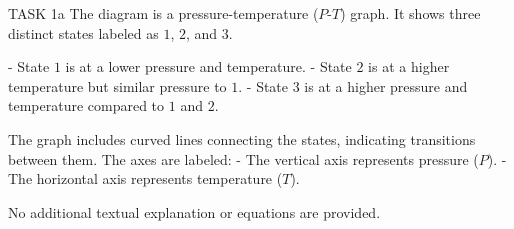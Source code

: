 TASK 1a  
The diagram is a pressure-temperature (\(P\)-\(T\)) graph. It shows three distinct states labeled as \(1\), \(2\), and \(3\).  

- State \(1\) is at a lower pressure and temperature.  
- State \(2\) is at a higher temperature but similar pressure to \(1\).  
- State \(3\) is at a higher pressure and temperature compared to \(1\) and \(2\).  

The graph includes curved lines connecting the states, indicating transitions between them. The axes are labeled:  
- The vertical axis represents pressure (\(P\)).  
- The horizontal axis represents temperature (\(T\)).  

No additional textual explanation or equations are provided.